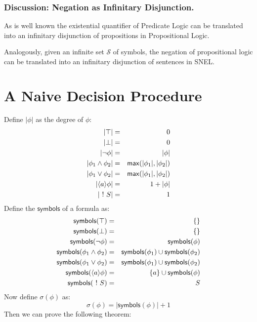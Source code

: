 \subsubsection{Discussion: Negation as Infinitary Disjunction. }
As is well known the existential quantifier of Predicate Logic can be translated into an infinitary disjunction of propositions in Propositional Logic.

Analogously, given an infinite set $\mathcal{S}$ of symbols, the negation of propositional logic can be translated into an infinitary disjunction of sentences in SNEL.



\section{A Naive Decision Procedure}
Define $|\phi|$ as the degree of $\phi$:
\begin{eqnarray}
|\top| & = & 0 \nonumber \\
|\bot| & = & 0 \nonumber \\
|\neg \phi| & = & | \phi | \nonumber \\
|\phi_1 \land \phi_2| & = & \mathsf{max}(| \phi_1 |, | \phi_2|) \nonumber \\
|\phi_1 \lor \phi_2| & = & \mathsf{max}(| \phi_1 |, | \phi_2|) \nonumber \\
|\langle a \rangle \phi | & = & 1 + | \phi | \nonumber \\
| \ ! \  S | & = & 1 \nonumber
\end{eqnarray}
Define the $\mathsf{symbols}$ of a formula as:
\begin{eqnarray}
\mathsf{symbols}(\top) & = & \{\} \nonumber \\
\mathsf{symbols}(\bot) & = & \{\} \nonumber \\
\mathsf{symbols}(\neg \phi) & = & \mathsf{symbols}(\phi) \nonumber \\
\mathsf{symbols}(\phi_1 \land \phi_2) & = &\mathsf{symbols}(\phi_1) \cup \mathsf{symbols}(\phi_2) \nonumber \\
\mathsf{symbols}(\phi_1 \lor \phi_2) & = &\mathsf{symbols}(\phi_1) \cup \mathsf{symbols}(\phi_2) \nonumber \\
\mathsf{symbols}(\langle a \rangle \phi) & = & \{a\} \cup \mathsf{symbols}(\phi) \nonumber \\
\mathsf{symbols}(\ ! \  S) & = & S \nonumber
\end{eqnarray}
Now define $\sigma(\phi)$ as:
\[
\sigma(\phi) = |\mathsf{symbols}(\phi)| + 1
\]
Then we can prove the following theorem:

